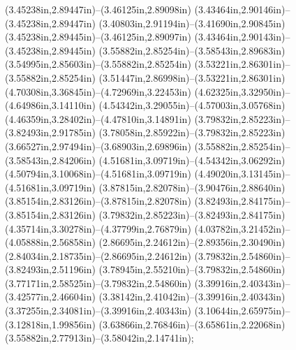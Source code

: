 (3.45238in,2.89447in)--(3.46125in,2.89098in) (3.43464in,2.90146in)--(3.45238in,2.89447in) (3.40803in,2.91194in)--(3.41690in,2.90845in) (3.45238in,2.89445in)--(3.46125in,2.89097in) (3.43464in,2.90143in)--(3.45238in,2.89445in) (3.55882in,2.85254in)--(3.58543in,2.89683in) (3.54995in,2.85603in)--(3.55882in,2.85254in) (3.53221in,2.86301in)--(3.55882in,2.85254in) (3.51447in,2.86998in)--(3.53221in,2.86301in) (4.70308in,3.36845in)--(4.72969in,3.22453in) (4.62325in,3.32950in)--(4.64986in,3.14110in) (4.54342in,3.29055in)--(4.57003in,3.05768in) (4.46359in,3.28402in)--(4.47810in,3.14891in) (3.79832in,2.85223in)--(3.82493in,2.91785in) (3.78058in,2.85922in)--(3.79832in,2.85223in) (3.66527in,2.97494in)--(3.68903in,2.69896in) (3.55882in,2.85254in)--(3.58543in,2.84206in) (4.51681in,3.09719in)--(4.54342in,3.06292in) (4.50794in,3.10068in)--(4.51681in,3.09719in) (4.49020in,3.13145in)--(4.51681in,3.09719in) (3.87815in,2.82078in)--(3.90476in,2.88640in) (3.85154in,2.83126in)--(3.87815in,2.82078in) (3.82493in,2.84175in)--(3.85154in,2.83126in) (3.79832in,2.85223in)--(3.82493in,2.84175in) (4.35714in,3.30278in)--(4.37799in,2.76879in) (4.03782in,3.21452in)--(4.05888in,2.56858in) (2.86695in,2.24612in)--(2.89356in,2.30490in) (2.84034in,2.18735in)--(2.86695in,2.24612in) (3.79832in,2.54860in)--(3.82493in,2.51196in) (3.78945in,2.55210in)--(3.79832in,2.54860in) (3.77171in,2.58525in)--(3.79832in,2.54860in) (3.39916in,2.40343in)--(3.42577in,2.46604in) (3.38142in,2.41042in)--(3.39916in,2.40343in) (3.37255in,2.34081in)--(3.39916in,2.40343in) (3.10644in,2.65975in)--(3.12818in,1.99856in) (3.63866in,2.76846in)--(3.65861in,2.22068in) (3.55882in,2.77913in)--(3.58042in,2.14741in);
